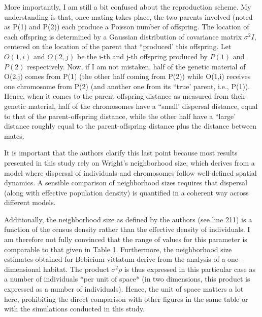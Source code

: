\begin{point}{}
More importantly, I am still a bit confused about the reproduction scheme. My understanding is that, once mating takes place, the two parents involved (noted as P(1) and P(2)) each produce a Poisson number of offspring. The location of each offspring is determined by a Gaussian distribution of covariance matrix $\sigma^2 I$, centered on the location of the parent that ``produced' this offspring. Let $O(1,i)$ and $O(2,j)$ be the i-th and j-th offspring produced by $P(1)$ and $P(2)$ respectively. Now, if I am not mistaken, half of the genetic material of O(2,j) comes from P(1) (the other half coming from P(2)) while O(1,i) receives one chromosome from P(2) (and another one from its ``true' parent, i.e., P(1)). Hence, when it comes to the parent-offspring distance as measured from their genetic material, half of the chromosomes have a ``small' dispersal distance, equal to that of the parent-offspring distance, while the other half have a ``large' distance roughly equal to the parent-offspring distance plus the distance between mates.
\end{point}



\begin{point}{}
It is important that the authors clarify this last point because most results presented in this study rely on Wright's neighborhood size, which derives from a model where dispersal of individuals and chromosomes follow well-defined spatial dynamics. A sensible comparison of neighborhood sizes requires that dispersal (along with effective population density) is quantified in a coherent way across different models.

Additionally, the neighborhood size as defined by the authors (see line 211) is a function of the census density rather than the effective density of individuals. I am therefore not fully convinced that the range of values for this parameter is comparable to that given in Table 1. Furthermore, the neighborhood size estimates obtained for Bebicium vittatum derive from the analysis of a one-dimensional habitat. The product $\sigma^2 \rho$ is thus expressed in this particular case as a number of individuals *per unit of space* (in two dimensions, this product is expressed as a number of individuals). Hence, the unit of space matters a lot here, prohibiting the direct comparison with other figures in the same table or with the simulations conducted in this study.
\end{point}

